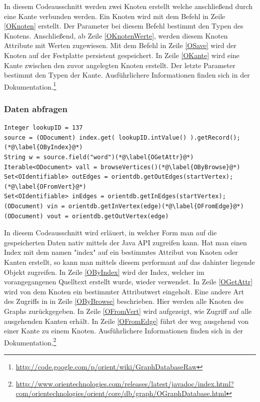 \documentclass[11pt, a4paper, oneside]{article} %
\begin{document}
In diesem Codeausschnitt werden zwei Knoten erstellt welche anschließend durch eine Kante verbunden werden. Ein Knoten wird mit dem Befehl in Zeile \ref{OKnoten} erstellt. Der Parameter bei diesem Befehl bestimmt den Typen des Knotens. Anschließend, ab Zeile \ref{OKnotenWerte}, werden diesem Knoten Attribute mit Werten zugewiesen. Mit dem Befehl in Zeile \ref{OSave} wird der Knoten auf der Festplatte persistent gespeichert. In Zeile \ref{OKante} wird eine Kante zwischen den zuvor angelegten Knoten erstellt. Der letzte Parameter bestimmt den Typen der Kante.
Ausführlichere Informationen finden sich in der Dokumentation.\footnote{\url{http://code.google.com/p/orient/wiki/GraphDatabaseRaw}}

\subsubsection{Daten abfragen}
\begin{lstlisting}[caption={OrientDB - Daten abfragen}]
Integer lookupID = 137
source = (ODocument) index.get( lookupID.intValue() ).getRecord();(*@\label{OByIndex}@*)
String w = source.field("word")(*@\label{OGetAttr}@*)
Iterable<ODocument> vall = browseVertices()(*@\label{OByBrowse}@*)
Set<OIdentifiable> outEdges = orientdb.getOutEdges(startVertex); (*@\label{OFromVert}@*)
Set<OIdentifiable> inEdges = orientdb.getInEdges(startVertex);
(ODocument) vin = orientdb.getInVertex(edge)(*@\label{OFromEdge}@*)
(ODocument) vout = orientdb.getOutVertex(edge)

\end{lstlisting}
In diesem Codeausschnitt wird erläuert, in welcher Form man auf die gespeicherten Daten nativ mittels der Java API zugreifen kann. Hat man einen Index mit dem namen "index" auf ein bestimmtes Attribut von Knoten oder Kanten erstellt, so kann man mittels diesem performant auf das dahinter liegende Objekt zugreifen. In Zeile \ref{OByIndex} wird der Index, welcher im vorangegangenen Quelltext erstellt wurde, wieder verwendet. In Zeile \ref{OGetAttr} wird von dem Knoten ein bestimmter Attributwert eingeholt. Eine andere Art des Zugriffs in in Zeile \ref{OByBrowse} beschrieben. Hier werden alle Knoten des Graphs zurückgegeben. In Zeile \ref{OFromVert} wird aufgezeigt, wie Zugriff auf alle ausgehenden Kanten erhält. In Zeile \ref{OFromEdge} führt der weg ausgehend von einer Kante zu einem Knoten.
Ausführlichere Informationen finden sich in der Dokumentation.\footnote{\url{http://www.orientechnologies.com/releases/latest/javadoc/index.html?com/orientechnologies/orient/core/db/graph/OGraphDatabase.html}}
\end{document}
